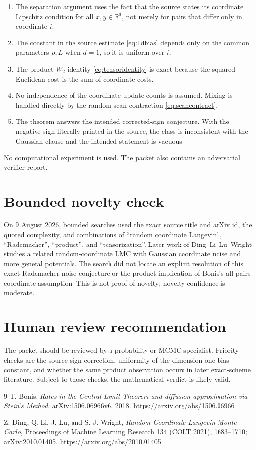 \documentclass[11pt]{article}
\newcommand{\R}{\mathbb R}
\begin{document}
\begin{enumerate}
\item The separation argument uses the fact that the source states its
coordinate Lipschitz condition for all $x,y\in\R^d$, not merely for pairs
that differ only in coordinate $i$.
\item The constant in the source estimate \eqref{eq:1dbias} depends only on
the common parameters $\rho,L$ when $d=1$, so it is uniform over $i$.
\item The product $W_2$ identity \eqref{eq:tensoridentity} is exact because
the squared Euclidean cost is the sum of coordinate costs.
\item No independence of the coordinate update counts is assumed. Mixing is
handled directly by the random-scan contraction \eqref{eq:scancontract}.
\item The theorem answers the intended corrected-sign conjecture. With the
negative sign literally printed in the source, the class is inconsistent
with the Gaussian clause and the intended statement is vacuous.
\end{enumerate}

No computational experiment is used. The packet also contains an adversarial
verifier report.

\section{Bounded novelty check}

On 9 August 2026, bounded searches used the exact source title and arXiv id,
the quoted complexity, and combinations of ``random coordinate Langevin'',
``Rademacher'', ``product'', and ``tensorization''. Later work of
Ding--Li--Lu--Wright \cite{DingEtAl} studies a related random-coordinate LMC
with Gaussian coordinate noise and more general potentials. The search did
not locate an explicit resolution of this exact Rademacher-noise conjecture or
the product implication of Bonis's all-pairs coordinate assumption. This is
not proof of novelty; novelty confidence is moderate.

\section{Human review recommendation}

The packet should be reviewed by a probability or MCMC specialist. Priority
checks are the source sign correction, uniformity of the dimension-one bias
constant, and whether the same product observation occurs in later exact-scheme
literature. Subject to those checks, the mathematical verdict is likely valid.

\begin{thebibliography}{9}
T. Bonis,
\emph{Rates in the Central Limit Theorem and diffusion approximation via
Stein's Method}, arXiv:1506.06966v6, 2018.
\url{https://arxiv.org/abs/1506.06966}

Z. Ding, Q. Li, J. Lu, and S. J. Wright,
\emph{Random Coordinate Langevin Monte Carlo},
Proceedings of Machine Learning Research 134 (COLT 2021), 1683--1710;
arXiv:2010.01405.
\url{https://arxiv.org/abs/2010.01405}
\end{thebibliography}
\end{document}
